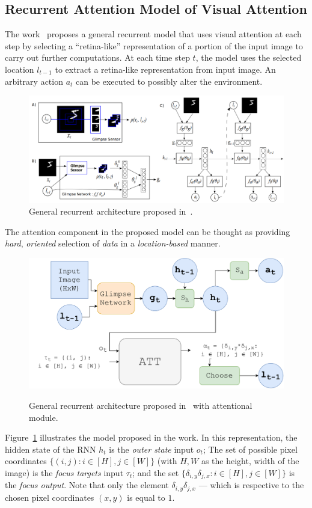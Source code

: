 \documentclass[11pt]{article}
\begin{document}
\subsection{Recurrent Attention Model of Visual Attention}
The work~\cite{ref:ram} proposes a general recurrent model that uses visual attention at each step
by selecting a ``retina-like'' representation of a portion of the input image to carry out further computations.
At each time step $t$, the model uses the selected location $l_{t-1}$ to extract a retina-like representation
from input image.
An arbitrary action $a_t$ can be executed to possibly alter the environment.

\begin{figure}[H]
    \centering
    \includegraphics[width=1.0\linewidth]{./img/ram.png}
    \caption{General recurrent architecture proposed in~\cite{ref:ram}.}
\end{figure}

The attention component in the proposed model can be thought as providing
\emph{hard}, \emph{oriented} selection of \emph{data} in a \emph{location-based} manner.

\begin{figure}[H]
    \centering
    \includegraphics[width=0.7\linewidth]{./img/ram.pdf}\label{fig:ram}
    \caption{General recurrent architecture proposed in~\cite{ref:ram} with attentional module.}
\end{figure}

Figure~\ref{fig:ram} illustrates the model proposed in the work.
In this representation, the hidden state of the RNN $h_t$ is the \emph{outer state} input $o_t$;
The set of possible pixel coordinates $\{(i, j): i \in [H], j \in [W]\}$ (with $H, W$ as the height, width of the image)
is the \emph{focus targets} input $\tau_t$;
and the set $\{\delta_{i, y}\delta_{j, x}: i \in [H], j \in [W]\}$ is the \emph{focus output}.
Note that only the element $\delta_{i, y}\delta_{j,x}$ --- which is respective to the chosen pixel coordinates $(x, y)$
is equal to $1$.
\end{document}
